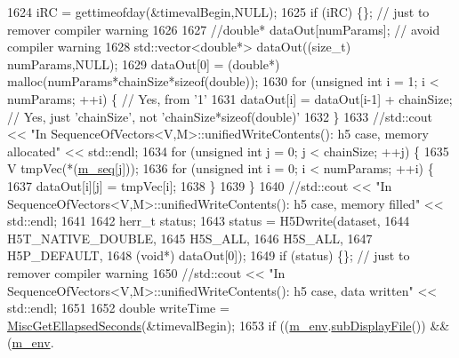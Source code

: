 \begin{DoxyCode}
1624               iRC = gettimeofday(&timevalBegin,NULL);
1625               \textcolor{keywordflow}{if} (iRC) \{\}; \textcolor{comment}{// just to remover compiler warning}
1626 
1627               \textcolor{comment}{//double* dataOut[numParams]; // avoid compiler warning}
1628         std::vector<double*> dataOut((\textcolor{keywordtype}{size\_t}) numParams,NULL);
1629               dataOut[0] = (\textcolor{keywordtype}{double}*) malloc(numParams*chainSize*\textcolor{keyword}{sizeof}(\textcolor{keywordtype}{double}));
1630               \textcolor{keywordflow}{for} (\textcolor{keywordtype}{unsigned} \textcolor{keywordtype}{int} i = 1; i < numParams; ++i) \{ \textcolor{comment}{// Yes, from '1'}
1631                 dataOut[i] = dataOut[i-1] + chainSize; \textcolor{comment}{// Yes, just 'chainSize', not
       'chainSize*sizeof(double)'}
1632               \}
1633               \textcolor{comment}{//std::cout << "In SequenceOfVectors<V,M>::unifiedWriteContents(): h5 case, memory allocated"
       << std::endl;}
1634               \textcolor{keywordflow}{for} (\textcolor{keywordtype}{unsigned} \textcolor{keywordtype}{int} j = 0; j < chainSize; ++j) \{
1635                 V tmpVec(*(\hyperlink{class_q_u_e_s_o_1_1_sequence_of_vectors_ae83e7c53439265667809256d0d302e5b}{m\_seq}[j]));
1636                 \textcolor{keywordflow}{for} (\textcolor{keywordtype}{unsigned} \textcolor{keywordtype}{int} i = 0; i < numParams; ++i) \{
1637                   dataOut[i][j] = tmpVec[i];
1638                 \}
1639               \}
1640               \textcolor{comment}{//std::cout << "In SequenceOfVectors<V,M>::unifiedWriteContents(): h5 case, memory filled" <<
       std::endl;}
1641 
1642               herr\_t status;
1643               status = H5Dwrite(dataset,
1644                                 H5T\_NATIVE\_DOUBLE,
1645                                 H5S\_ALL,
1646                                 H5S\_ALL,
1647                                 H5P\_DEFAULT,
1648                                 (\textcolor{keywordtype}{void}*) dataOut[0]);
1649               \textcolor{keywordflow}{if} (status) \{\}; \textcolor{comment}{// just to remover compiler warning}
1650               \textcolor{comment}{//std::cout << "In SequenceOfVectors<V,M>::unifiedWriteContents(): h5 case, data written" <<
       std::endl;}
1651 
1652               \textcolor{keywordtype}{double} writeTime = \hyperlink{namespace_q_u_e_s_o_a424bc33f2e6e287fd468408d14b772ee}{MiscGetEllapsedSeconds}(&timevalBegin);
1653               \textcolor{keywordflow}{if} ((\hyperlink{class_q_u_e_s_o_1_1_base_vector_sequence_a8e8824d2a63c5a43bcc6473e3a0491e8}{m\_env}.\hyperlink{class_q_u_e_s_o_1_1_base_environment_a8a0064746ae8dddfece4229b9ad374d6}{subDisplayFile}()) && (\hyperlink{class_q_u_e_s_o_1_1_base_vector_sequence_a8e8824d2a63c5a43bcc6473e3a0491e8}{m\_env}.

\end{DoxyCode}
